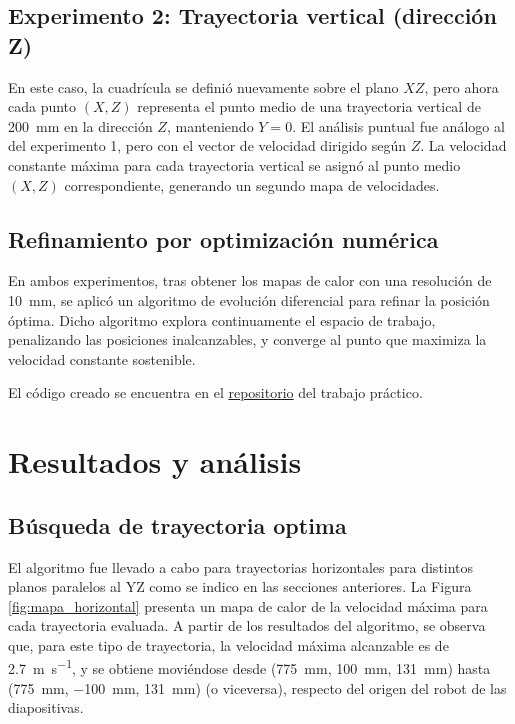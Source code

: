 \subsection{Experimento 2: Trayectoria vertical (dirección Z)}
En este caso, la cuadrícula se definió nuevamente sobre el plano $XZ$, pero ahora cada punto $(X,Z)$ representa el punto medio de una trayectoria vertical de \SI{200}{\mm} en la dirección $Z$, manteniendo $Y=0$. El análisis puntual fue análogo al del experimento 1, pero con el vector de velocidad dirigido según $Z$. La velocidad constante máxima para cada trayectoria vertical se asignó al punto medio $(X,Z)$ correspondiente, generando un segundo mapa de velocidades.

\subsection{Refinamiento por optimización numérica}
En ambos experimentos, tras obtener los mapas de calor con una resolución de \SI{10}{\mm}, se aplicó un algoritmo de evolución diferencial para refinar la posición óptima. Dicho algoritmo explora continuamente el espacio de trabajo, penalizando las posiciones inalcanzables, y converge al punto que maximiza la velocidad constante sostenible.


El código creado se encuentra en el \href{https://github.com/Icavicchioli/Robotica-Industrial-Tps/tree/1b1454d01ef875238b37204d2b72a497e9b86118/c%C3%B3digo%20manuel}{repositorio} del trabajo práctico.

\clearpage
\section{Resultados y análisis}

\subsection{Búsqueda de trayectoria optima}
El algoritmo fue llevado a cabo para trayectorias horizontales para distintos planos paralelos al YZ como se indico en las secciones anteriores. La Figura \ref{fig:mapa_horizontal} presenta un mapa de calor de la velocidad máxima para cada trayectoria evaluada. A partir de los resultados del algoritmo, se observa que, para este tipo de trayectoria, la velocidad máxima alcanzable es de \SI{2,7}{\m \per \s}, y se obtiene moviéndose desde (\SI{775}{\mm}, \SI{100}{\mm}, \SI{131}{\mm}) hasta (\SI{775}{\mm}, \SI{-100}{\mm}, \SI{131}{\mm}) (o viceversa), respecto del origen del robot de las diapositivas.



